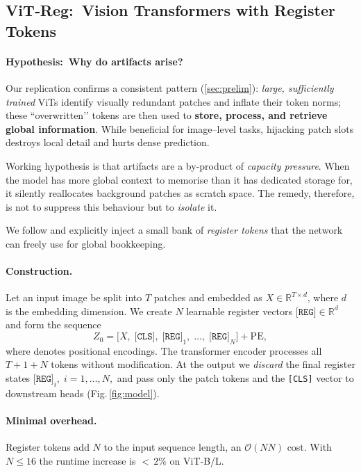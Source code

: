 \documentclass{article}
\newcommand{\RegTok}{\texttt{[REG]}\xspace}
\newcommand{\nreg}{N}
\newcommand{\citet}{\textcite}
\begin{document}
\subsection{ViT‑Reg: Vision Transformers with Register Tokens}
\label{sec:method_registers}

\paragraph{Hypothesis: Why do artifacts arise?}
Our replication confirms a consistent pattern (\cref{sec:prelim}):  
\emph{large, sufficiently trained} ViTs identify visually redundant patches and inflate their token norms; these “overwritten’’ tokens are then used to \textbf{store, process, and retrieve global information}.  
While beneficial for image–level tasks, hijacking patch slots destroys local detail and hurts dense prediction.

Working hypothesis is that artifacts are a by‑product of \emph{capacity pressure}.  
When the model has more global context to memorise than it has dedicated storage for, it silently reallocates background patches as scratch space.  
The remedy, therefore, is not to suppress this behaviour but to \emph{isolate} it.

We follow \citet{darcetVisionTransformersNeed2024} and explicitly inject a small bank of \emph{register tokens} that the network can freely use for global bookkeeping.

\paragraph{Construction.}
Let an input image be split into $T$ patches and embedded as $X\!\in\!\mathbb R^{T\times d}$, where $d$ is the embedding dimension.
We create $\nreg$ learnable register vectors $\RegTok\!\in\!\mathbb R^d$ and form the sequence
\begin{equation}
Z_0 = \bigl[X,\; \texttt{[CLS]},\; \RegTok_1,\; \ldots,\; \RegTok_{\nreg}\bigr] + \text{PE},
\end{equation}
where  denotes positional encodings.  
The transformer encoder processes all $T+1+\nreg$ tokens without modification.  
At the output we \emph{discard} the final register states $\RegTok_i,\;i=1,\ldots,\nreg,$ and pass only the patch tokens and the \texttt{[CLS]} vector to downstream heads (Fig.\,\ref{fig:model}).

\paragraph{Minimal overhead.}
Register tokens add $\nreg$ to the input sequence length, an $\mathcal{O}(\nreg N)$ cost.
With $\nreg\!\le\!16$ the runtime increase is $<\,2\%$ on ViT‑B/L.
\end{document}

